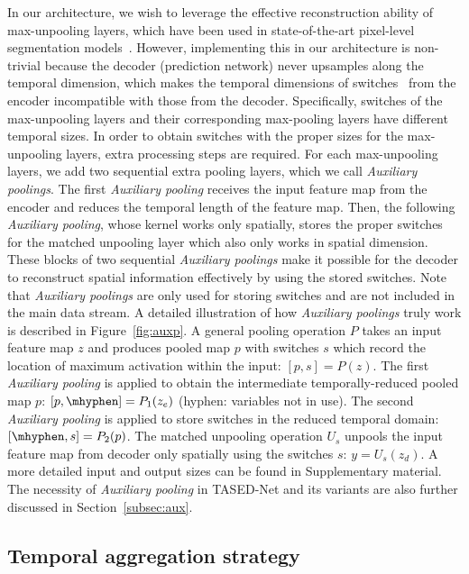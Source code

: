 \documentclass[10pt,twocolumn,letterpaper]{article}
\newcommand{\modelname}{TASED-Net}
\newcommand{\auxpnamet}{Auxiliary pooling}
\newcommand{\auxpname}{\textit{\auxpnamet}}
\begin{document}
In our architecture, we wish to leverage the effective reconstruction ability of max-unpooling layers, which have been used in state-of-the-art pixel-level segmentation models~\cite{badrinarayanan2015segnet, noh2015learning}. However, implementing this in our architecture is non-trivial because the decoder (prediction network) never upsamples along the temporal dimension, which makes the temporal dimensions of switches~\cite{zeiler2011adaptive} from the encoder incompatible with those from the decoder. Specifically, switches of the max-unpooling layers and their corresponding max-pooling layers have different temporal sizes. In order to obtain switches with the proper sizes for the max-unpooling layers, extra processing steps are required. For each max-unpooling layers, we add two sequential extra pooling layers, which we call \auxpname{\textit{s}}. The first \auxpname{} receives the input feature map from the encoder and reduces the temporal length of the feature map. Then, the following \auxpname{}, whose kernel works only spatially, stores the proper switches for the matched unpooling layer which also only works in spatial dimension. These blocks of two sequential \auxpname{\textit{s}} make it possible for the decoder to reconstruct spatial information effectively by using the stored switches. Note that \auxpname{\textit{s}} are only used for storing switches and are not included in the main data stream. A detailed illustration of how \auxpname{\textit{s}} truly work is described in Figure~\ref{fig:auxp}. A general pooling operation $P$ takes an input feature map $z$ and produces pooled map $p$ with switches $s$ which record the location of maximum activation within the input: $[p, s] = P(z)$. The first \auxpname{} is applied to obtain the intermediate temporally-reduced pooled map $p$: $[p, \mhyphen] = P_1(z_e)$ (hyphen: variables not in use). The second \auxpname{} is applied to store switches in the reduced temporal domain: $[\mhyphen, s] = P_2(p)$. The matched unpooling operation $U_s$ unpools the input feature map from decoder only spatially using the switches $s$: $y=U_s(z_d)$. A more detailed input and output sizes can be found in Supplementary material. The necessity of \auxpname{} in \modelname{} and its variants are also further discussed in Section~\ref{subsec:aux}.


\subsection{Temporal aggregation strategy}
\end{document}
